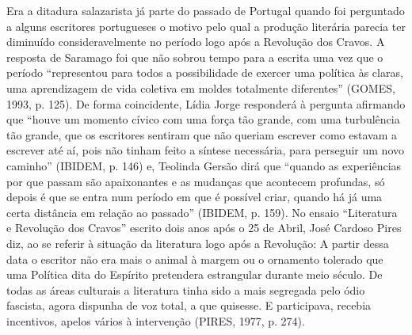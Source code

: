 \documentclass[../DISSERTACAO_MAIN.tex]{subfiles}
\begin{document}
Era a ditadura salazarista já parte do passado de Portugal quando foi perguntado a alguns escritores portugueses o motivo pelo qual a produção literária parecia ter diminuído  consideravelmente no período logo após a Revolução dos Cravos. A resposta de Saramago foi que não sobrou tempo para a escrita uma vez que o período “representou para todos a possibilidade de exercer uma política às claras, uma aprendizagem de vida coletiva em moldes totalmente diferentes” (GOMES, 1993, p. 125). De forma coincidente, Lídia Jorge responderá à pergunta afirmando que “houve um momento cívico com uma força tão grande, com uma turbulência tão grande, que os escritores sentiram que não queriam escrever como estavam a escrever até aí, pois não tinham feito a síntese necessária, para perseguir um novo caminho” (IBIDEM, p. 146) e, Teolinda Gersão dirá que “quando as experiências por que passam são apaixonantes e as mudanças que acontecem profundas, só depois é que se entra num período em que é possível criar, quando há já uma certa distância em relação ao passado” (IBIDEM, p. 159). No ensaio “Literatura e Revolução dos Cravos” escrito dois anos após o 25 de Abril, José Cardoso Pires diz, ao se referir à situação da literatura logo após a Revolução:
A partir dessa data o escritor não era mais o animal à margem ou o ornamento tolerado que uma Política dita do Espírito pretendera estrangular durante meio século. De todas as áreas culturais a literatura tinha sido a mais segregada pelo ódio fascista, agora dispunha de voz total, a que quisesse. E participava, recebia incentivos, apelos vários à intervenção (PIRES, 1977, p. 274).
\end{document}
